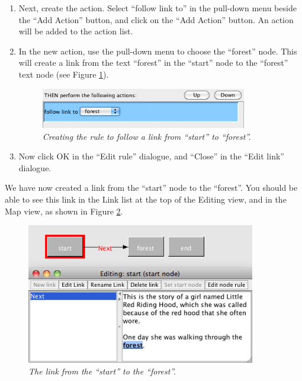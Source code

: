 \documentclass{article}
\begin{document}
\begin{enumerate}
\item Next, create the action. Select ``follow link to'' in the pull-down menu
beside the ``Add Action'' button, and click on the ``Add Action'' button. An
action will be added to the action list.

\item In the new action, use the pull-down menu to choose the ``forest'' node.
This will create a link from the text ``forest'' in the ``start'' node to the
``forest'' text node (see Figure \ref{fig:tut1:create_action}).

\begin{figure}[ht]
  \centering
  \includegraphics[width=9cm]{images/hypedyn-tutorial-1-figure-8d}
  \caption{\textit{Creating the rule to follow a link from ``start'' to
  ``forest''.}}
  \label{fig:tut1:create_action}
\end{figure} 

\item Now click OK in the ``Edit rule'' dialogue, and ``Close'' in the ``Edit
link'' dialogue.
\end{enumerate}

We have now created a link from the ``start'' node to the ``forest''. You
should be able to see this link in the Link list at the top of the Editing
view, and in the Map view, as shown in Figure \ref{fig:tut1:new_link_mapview}.
  
\begin{figure}[ht]
  \centering
  \includegraphics[width=10cm]{images/hypedyn-tutorial-1-figure-9}
  \caption{\textit{The link from the ``start'' to the ``forest''.}}
  \label{fig:tut1:new_link_mapview}
\end{figure} 
\end{document}
